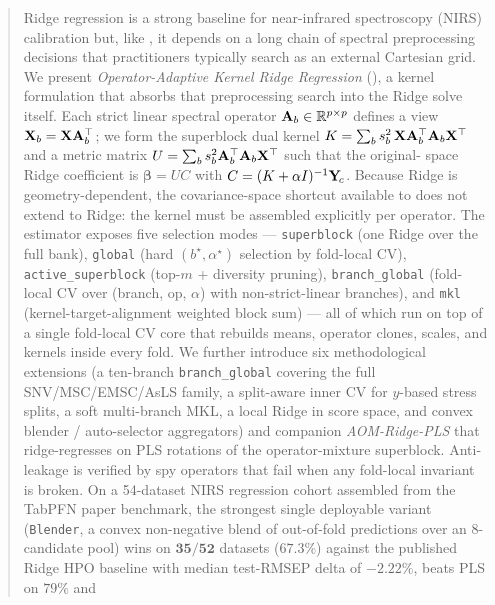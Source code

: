 
\begin{abstract}
Ridge regression is a strong baseline for near-infrared spectroscopy
(NIRS) calibration but, like \PLS, it depends on a long chain of
spectral preprocessing decisions that practitioners typically search as
an external Cartesian grid. We present \emph{Operator-Adaptive Kernel
Ridge Regression} (\AOMR), a kernel formulation that absorbs that
preprocessing search into the Ridge solve itself. Each strict linear
spectral operator $\Amat_b\in\R^{p\times p}$ defines a view
$\Xmat_b=\Xmat\Amat_b^\top$; we form the superblock dual kernel
$K=\sum_b s_b^2\,\Xmat\Amat_b^\top\Amat_b\Xmat^\top$ and a metric matrix
$U=\sum_b s_b^2\Amat_b^\top\Amat_b\Xmat^\top$ such that the original-
space Ridge coefficient is $\bm\beta=U C$ with
$C=(K+\alpha I)^{-1}\Yc$. Because Ridge is geometry-dependent, the
covariance-space shortcut available to \PLS does not extend to Ridge:
the kernel must be assembled explicitly per operator. The estimator
exposes five selection modes --- \texttt{superblock} (one Ridge over the
full bank), \texttt{global} (hard $(b^\star,\alpha^\star)$ selection by
fold-local CV), \texttt{active\_superblock} (top-$m$ + diversity
pruning), \texttt{branch\_global} (fold-local CV over (branch, op,
$\alpha$) with non-strict-linear branches), and \texttt{mkl}
(kernel-target-alignment weighted block sum) --- all of which run on
top of a single fold-local CV core that rebuilds means, operator
clones, scales, and kernels inside every fold. We further introduce
six methodological extensions (a ten-branch \texttt{branch\_global}
covering the full SNV/MSC/EMSC/AsLS family, a split-aware inner CV for
$y$-based stress splits, a soft multi-branch MKL, a local Ridge in
score space, and convex blender / auto-selector aggregators) and
companion \emph{AOM-Ridge-PLS} that ridge-regresses on PLS rotations of
the operator-mixture superblock. Anti-leakage is verified by spy
operators that fail when any fold-local invariant is broken. On a
54-dataset NIRS regression cohort assembled from the TabPFN paper
benchmark, the strongest single deployable variant
(\texttt{Blender}, a convex non-negative blend of out-of-fold
predictions over an 8-candidate pool) wins on $\bm{35/52}$
datasets ($67.3\%$) against the published Ridge HPO baseline with
median test-RMSEP delta of $\bm{-2.22\%}$, beats PLS on $79\%$ and

\end{abstract}
